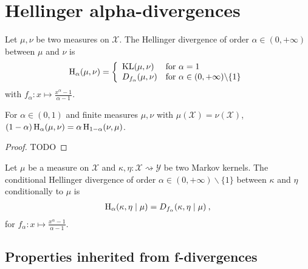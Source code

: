 \chapter{Hellinger alpha-divergences}

\begin{definition}
  \label{def:hellingerAlpha}
  \leanok
  Let $\mu, \nu$ be two measures on $\mathcal X$. The Hellinger divergence of order $\alpha \in (0,+\infty)$ between $\mu$ and $\nu$ is
  \begin{align*}
  \operatorname{H}_\alpha(\mu, \nu) = \left\{
  \begin{array}{ll}
    \operatorname{KL}(\mu, \nu) & \text{for } \alpha = 1
    \\
    D_{f_\alpha}(\mu, \nu) & \text{for } \alpha \in (0,+\infty) \backslash \{1\}
  \end{array}\right.
  \end{align*}
  with $f_\alpha : x \mapsto \frac{x^{\alpha} - 1}{\alpha - 1}$.
\end{definition}

\begin{lemma}
  \label{lem:hellingerAlpha_symm}
  \leanok
  For $\alpha \in (0, 1)$ and finite measures $\mu, \nu$ with $\mu(\mathcal X) = \nu(\mathcal X)$, $(1 - \alpha) \operatorname{H}_\alpha(\mu, \nu) = \alpha \operatorname{H}_{1 - \alpha}(\nu, \mu)$.
\end{lemma}

\begin{proof}\leanok
TODO
\end{proof}


\begin{definition}
  \label{def:condHellingerAlpha}
  Let $\mu$ be a measure on $\mathcal X$ and $\kappa, \eta : \mathcal X \rightsquigarrow \mathcal Y$ be two Markov kernels. The conditional Hellinger divergence of order $\alpha \in (0,+\infty) \backslash \{1\}$ between $\kappa$ and $\eta$ conditionally to $\mu$ is
  \begin{align*}
  \operatorname{H}_\alpha(\kappa, \eta \mid \mu) = D_{f_\alpha}(\kappa, \eta \mid \mu) \: ,
  \end{align*}
  for $f_\alpha : x \mapsto \frac{x^{\alpha} - 1}{\alpha - 1}$.
\end{definition}


\section{Properties inherited from f-divergences}

